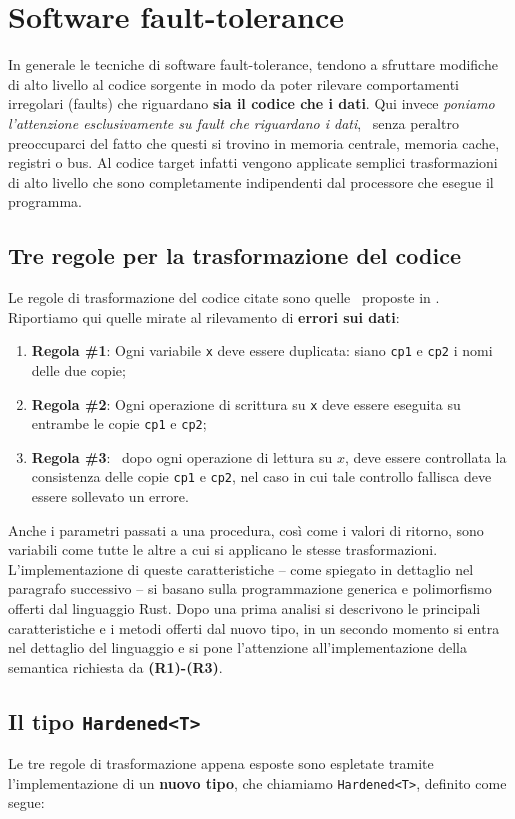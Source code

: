 \section{Software fault-tolerance} \label{sec:hardened}
In generale le tecniche di software fault-tolerance, tendono a sfruttare modifiche di alto livello al codice sorgente in modo da poter rilevare comportamenti irregolari (faults) che riguardano \textbf{sia il codice che i dati}. Qui invece \textit{poniamo l’attenzione esclusivamente su fault che riguardano i dati},  senza peraltro preoccuparci del fatto che questi si trovino in memoria centrale, memoria cache, registri o bus. Al codice target infatti vengono applicate semplici trasformazioni di alto livello che sono completamente indipendenti dal processore che esegue il programma. 
\subsection{Tre regole per la trasformazione del codice}
Le regole di trasformazione del codice citate sono quelle  proposte in \cite{802887}. Riportiamo qui quelle mirate al rilevamento di \textbf{errori sui dati}:
\begin{enumerate}
    \itemsep-0.2em
    \item \textbf{Regola \#1}: Ogni variabile \texttt{x} deve essere duplicata: siano \texttt{cp1} e \texttt{cp2} i nomi delle due copie;
    \item \textbf{Regola \#2}: Ogni operazione di scrittura su \texttt{x} deve essere eseguita su entrambe le copie \texttt{cp1} e \texttt{cp2};
    \item \textbf{Regola \#3}:  dopo ogni operazione di lettura su $x$, deve essere controllata la consistenza delle copie \texttt{cp1} e \texttt{cp2}, nel caso in cui tale controllo fallisca deve essere sollevato un errore.
\end{enumerate}
Anche i parametri passati a una procedura, così come i valori di ritorno, sono variabili come tutte le altre a cui si applicano le stesse trasformazioni. L'implementazione di queste caratteristiche -- come spiegato in dettaglio nel paragrafo successivo -- si basano sulla programmazione generica e polimorfismo offerti dal linguaggio Rust. Dopo una prima analisi si descrivono le principali caratteristiche e i metodi offerti dal nuovo tipo, in un secondo momento si entra nel dettaglio del linguaggio e si pone l'attenzione all'implementazione della semantica richiesta da \textbf{(R1)-(R3)}.

\subsection{Il tipo \texttt{Hardened<T>}}
Le tre regole di trasformazione appena esposte sono espletate tramite l'implementazione di un \textbf{nuovo tipo}, che chiamiamo \texttt{Hardened<T>}, definito come segue: 

